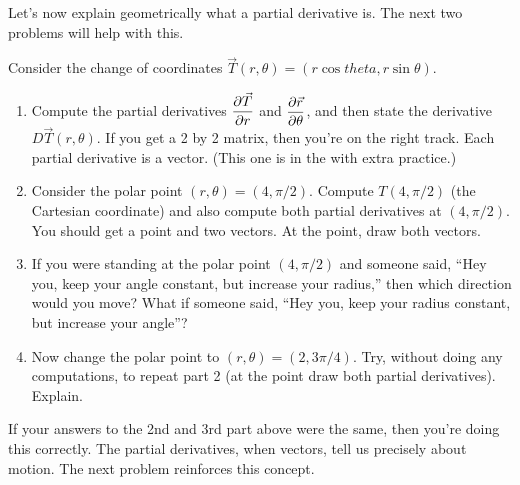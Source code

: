Let's now explain geometrically what a partial derivative is. The next two problems will help with this.
\begin{problem}
 Consider the change of coordinates $\vec T(r,\theta) = (r\cos theta, r\sin \theta)$.
\begin{enumerate}
 \item Compute the partial derivatives $\displaystyle\frac{\partial \vec T}{\partial r}$ and $\displaystyle\frac{\partial \vec r}{\partial \theta}$, and then state the derivative $D\vec T(r,\theta)$. If you get a 2 by 2 matrix, then you're on the right track. Each partial derivative is a vector.  (This one is in the  with extra practice.)
 \item Consider the polar point $(r,\theta) = (4,\pi/2)$. Compute $T(4,\pi/2)$ (the Cartesian coordinate) and also compute both partial derivatives at $(4,\pi/2)$. You should get a point and two vectors.  At the point, draw both vectors.
 \item If you were standing at the polar point $(4,\pi/2)$ and someone said, ``Hey you, keep your angle constant, but increase your radius,'' then which direction would you move?  What if someone said, ``Hey you, keep your radius constant, but increase your angle''?
 \item Now change the polar point to $(r,\theta) = (2,3\pi/4)$.  Try, without doing  any computations, to repeat part 2 (at the point draw both partial derivatives). Explain.
\end{enumerate}
\end{problem}

If your answers to the 2nd and 3rd part above were the same, then you're doing this correctly.  The partial derivatives, when vectors, tell us precisely about motion. The next problem reinforces this concept.


